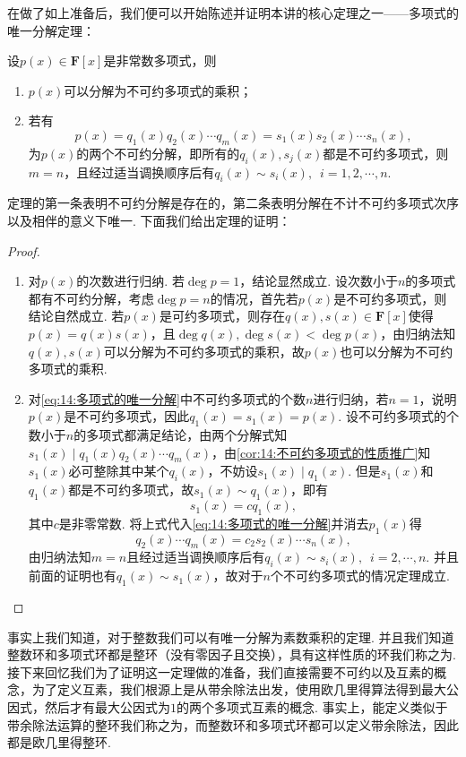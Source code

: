 在做了如上准备后，我们便可以开始陈述并证明本讲的核心定理之一——多项式的唯一分解定理：
\begin{theorem}[多项式的唯一分解定理] \label{thm:14:多项式的唯一分解定理}
    设$p(x)\in\mathbf{F}[x]$是非常数多项式，则
    \begin{enumerate}
        \item $p(x)$可以分解为不可约多项式的乘积；
        \item 若有
        \begin{equation} \label{eq:14:多项式的唯一分解}
            p(x)=q_1(x)q_2(x)\cdots q_m(x)=s_1(x)s_2(x)\cdots s_n(x),
        \end{equation}
        为$p(x)$的两个不可约分解，即所有的$q_i(x),s_j(x)$都是不可约多项式，则$m=n$，且经过适当调换顺序后有$q_i(x)\sim s_i(x),\enspace i=1,2,\cdots,n$.
    \end{enumerate}
\end{theorem}
定理的第一条表明不可约分解是存在的，第二条表明分解在不计不可约多项式次序以及相伴的意义下唯一. 下面我们给出定理的证明：
\begin{proof}
    \begin{enumerate}
        \item 对$p(x)$的次数进行归纳. 若$\deg p=1$，结论显然成立. 设次数小于$n$的多项式都有不可约分解，考虑$\deg p=n$的情况，首先若$p(x)$是不可约多项式，则结论自然成立. 若$p(x)$是可约多项式，则存在$q(x),s(x)\in\mathbf{F}[x]$使得$p(x)=q(x)s(x)$，且$\deg q(x),\deg s(x)<\deg p(x)$，由归纳法知$q(x),s(x)$可以分解为不可约多项式的乘积，故$p(x)$也可以分解为不可约多项式的乘积.
        \item 对\autoref{eq:14:多项式的唯一分解}中不可约多项式的个数$n$进行归纳，若$n=1$，说明$p(x)$是不可约多项式，因此$q_1(x)=s_1(x)=p(x)$. 设不可约多项式的个数小于$n$的多项式都满足结论，由两个分解式知$s_1(x)\mid q_1(x)q_2(x)\cdots q_m(x)$，由\autoref{cor:14:不可约多项式的性质推广}知$s_1(x)$必可整除其中某个$q_i(x)$，不妨设$s_1(x)\mid q_1(x)$. 但是$s_1(x)$和$q_1(x)$都是不可约多项式，故$s_1(x)\sim q_1(x)$，即有
        \[s_1(x)=cq_1(x),\]
        其中$c$是非零常数. 将上式代入\autoref{eq:14:多项式的唯一分解}并消去$p_1(x)$得
        \[q_2(x)\cdots q_m(x)=c_2s_2(x)\cdots s_n(x),\]
        由归纳法知$m=n$且经过适当调换顺序后有$q_i(x)\sim s_i(x),\enspace i=2,\cdots,n$. 并且前面的证明也有$q_1(x)\sim s_1(x)$，故对于$n$个不可约多项式的情况定理成立.
    \end{enumerate}
\end{proof}

事实上我们知道，对于整数我们可以有唯一分解为素数乘积的定理. 并且我们知道整数环和多项式环都是整环（没有零因子且交换），具有这样性质的环我们称之为. 接下来回忆我们为了证明这一定理做的准备，我们直接需要不可约以及互素的概念，为了定义互素，我们根源上是从带余除法出发，使用欧几里得算法得到最大公因式，然后才有最大公因式为$1$的两个多项式互素的概念. 事实上，能定义类似于带余除法运算的整环我们称之为，而整数环和多项式环都可以定义带余除法，因此都是欧几里得整环.

